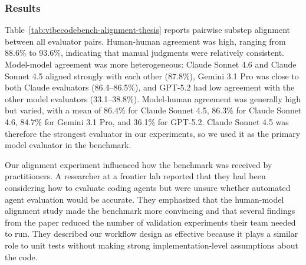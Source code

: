 \subsubsection{Results}

\begin{table}[tbp]
\caption{Pairwise step-level agreement (\%) across model and human evaluators.}
\label{tab:vibecodebench-alignment-thesis}
\centering
\small
{}
\end{table}

Table~\ref{tab:vibecodebench-alignment-thesis} reports pairwise substep
alignment between all evaluator pairs. Human-human agreement was high, ranging
from 88.6\% to 93.6\%, indicating that manual judgments were relatively consistent.
Model-model agreement was more heterogeneous: Claude Sonnet 4.6 and Claude Sonnet 4.5 aligned strongly with each other
(87.8\%), Gemini 3.1 Pro was close to both Claude evaluators (86.4--86.5\%), and
GPT-5.2 had low agreement with the other model evaluators (33.1--38.8\%). Model-human agreement was generally high but varied, with a mean of 86.4\% for
Claude Sonnet 4.5, 86.3\% for Claude Sonnet 4.6, 84.7\% for Gemini 3.1 Pro,
and 36.1\% for GPT-5.2. Claude Sonnet 4.5 was therefore the strongest evaluator
in our experiments, so we used it as the primary model evaluator in the benchmark.

Our alignment experiment influenced how the benchmark was received by
practitioners. A researcher at a frontier lab reported that they had been
considering how to evaluate coding agents but were unsure whether automated
agent evaluation would be accurate. They emphasized that the
human-model alignment study made the benchmark more convincing and that several
findings from the paper reduced the number of validation experiments their team
needed to run. They described our workflow design as effective because it plays a
similar role to unit tests without making strong implementation-level assumptions about the
code.
